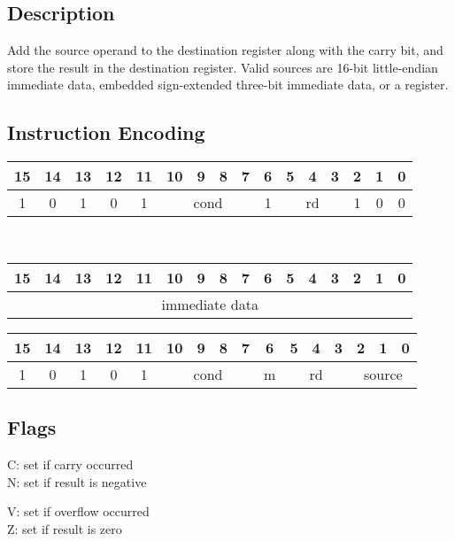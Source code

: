 \documentclass[11pt]{book}
\newcommand*{\encoding}[1]{\noindent
\begin{tabular}{|c|c|c|c|c|c|c|c|c|c|c|c|c|c|c|c|}
\multicolumn{1}{c}{15}&
\multicolumn{1}{c}{14}&
\multicolumn{1}{c}{13}&
\multicolumn{1}{c}{12}&
\multicolumn{1}{c}{11}&
\multicolumn{1}{c}{10}&
\multicolumn{1}{c}{9}&
\multicolumn{1}{c}{8}&
\multicolumn{1}{c}{7}&
\multicolumn{1}{c}{6}&
\multicolumn{1}{c}{5}&
\multicolumn{1}{c}{4}&
\multicolumn{1}{c}{3}&
\multicolumn{1}{c}{2}&
\multicolumn{1}{c}{1}&
\multicolumn{1}{c}{0}\\\hline
#1\\\hline
\end{tabular}}
\begin{document}
\subsection*{Description}
Add the source operand to the destination register
along with the carry bit,
and store the result in the destination register.
Valid sources are 16-bit little-endian immediate data,
embedded sign-extended three-bit immediate data,
or a register.

\subsection*{Instruction Encoding}
\encoding{1&0&1&0&1%
&\multicolumn{4}{|c|}{cond}%
&1&\multicolumn{3}{|c|}{rd}&1&0&0}\\\null\qquad
\encoding{\multicolumn{16}{|c|}{immediate data}}

\vspace{2\baselineskip}
\encoding{1&0&1&0&1%
&\multicolumn{4}{|c|}{cond}%
&m&\multicolumn{3}{|c|}{rd}&\multicolumn{3}{|c|}{source}}

\subsection*{Flags}
\begin{multicols}{2}\noindent
  C: set if carry occurred\\
  N: set if result is negative

  \columnbreak\noindent
  V: set if overflow occurred\\
  Z: set if result is zero
\end{multicols}
\end{document}
